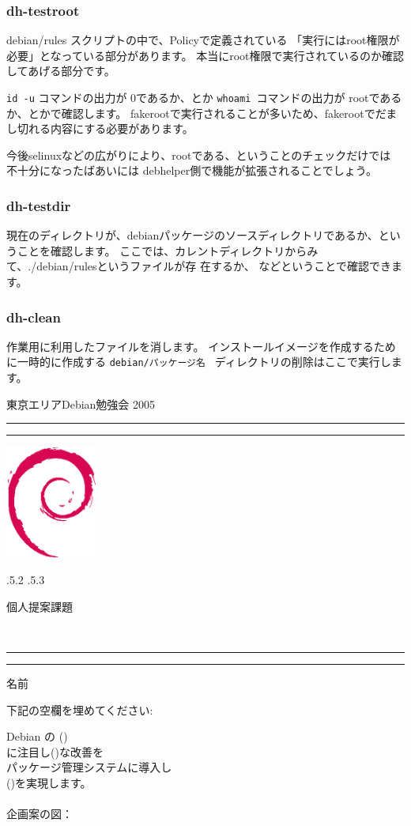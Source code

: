 \documentclass[mingoth]{jsarticle}
\makeatletter
\renewcommand{\section}{\@startsection{section}{1}{\z@}%
    {\Cvs \@plus.5\Cdp \@minus.2\Cdp}%
    {.5\Cvs \@plus.3\Cdp}%
    {\normalfont\Large\headfont\raggedright\centering}} %
\newcommand{\dancersection}[2]{%
\newpage
東京エリアDebian勉強会 2005
\hrule
\vspace{0.5mm}
\hrule
\hfill{}\includegraphics[width=3cm]{image200502/openlogo-nd.eps}\\
\vspace{-4cm}
\begin{center}
  \section{#1}
\end{center}
\hfill{}#2\hspace{3cm}\space\\
\hrule
\hrule
\vspace{1cm}
}
\makeatother
\begin{document}
\subsubsection{dh-testroot}

debian/rules スクリプトの中で、Policyで定義されている
「実行にはroot権限が必要」となっている部分があります。
本当にroot権限で実行されているのか確認してあげる部分です。

{\tt id -u}  コマンドの出力が 0であるか、とか
{\tt whoami }コマンドの出力が rootであるか、とかで確認します。
fakerootで実行されることが多いため、fakerootでだまし切れる内容にする必要があります。

今後selinuxなどの広がりにより、rootである、ということのチェックだけでは
不十分になったばあいには
debhelper側で機能が拡張されることでしょう。

\subsubsection{dh-testdir}

現在のディレクトリが、debianパッケージのソースディレクトリであるか、とい
うことを確認します。
ここでは、カレントディレクトリからみて、./debian/rulesというファイルが存
在するか、
などということで確認できます。

\subsubsection{dh-clean}

作業用に利用したファイルを消します。
インストールイメージを作成するために一時的に作成する
{\tt debian/パッケージ名 } ディレクトリの削除はここで実行します。




\newpage

\dancersection{個人提案課題}{}
\hfill{}{\large 名前} \underline{\hspace{6cm}}

下記の空欄を埋めてください:

{\LARGE 
Debian の (\hspace{5cm})\\
に注目し(\hspace{6cm})な改善を\\
パッケージ管理システムに導入し\\
(\hspace{6cm})を実現します。
}
\\\\
企画案の図：
\end{document}

